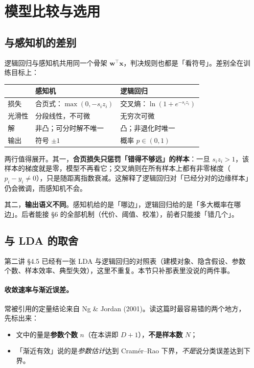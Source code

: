 \documentclass[11pt,a4paper,fontset=windows,zihao=-4]{ctexart}
\newcommand{\bw}{\mathbf{w}}
\newcommand{\bx}{\mathbf{x}}
\newcommand{\tp}{^{\top}}
\newcommand{\tabhead}{\sffamily\bfseries\color{navy}}
\begin{document}
\section{模型比较与选用}

\subsection{与感知机的差别}

逻辑回归与感知机共用同一个骨架 $\bw\tp\bx$，判决规则也都是「看符号」。差别全在训练目标上：

\begin{center}
\small
\begin{tabular}{@{}lp{5.4cm}p{5.4cm}@{}}
\toprule
\rowcolor{navy!7}
\tabhead & \tabhead 感知机 & \tabhead 逻辑回归\\
\midrule
损失 & 合页式：$\max(0,-s_i z_i)$ & 交叉熵：$\ln(1+e^{-s_iz_i})$\\
光滑性 & 分段线性，不可微 & 无穷次可微\\
解 & 非凸；可分时解不唯一 & 凸；非退化时唯一\\
输出 & 符号 $\pm1$ & 概率 $p\in(0,1)$\\
\bottomrule
\end{tabular}
\end{center}

两行值得展开。其一，\textbf{合页损失只惩罚「错得不够远」的样本}：一旦 $s_iz_i>1$，该样本的梯度就是零，模型不再看它；交叉熵则在所有样本上都有非零梯度（$p_i-y_i\ne0$），只是随距离指数衰减。这解释了逻辑回归对「已经分对的边缘样本」仍会微调，而感知机不会。

其二，\textbf{输出语义不同}。感知机给的是「哪边」，逻辑回归给的是「多大概率在哪边」。后者能接 \S6 的全部机制（代价、阈值、校准），前者只能接「错几个」。

\subsection{与 LDA 的取舍}

第二讲 \S4.5 已经有一张 LDA 与逻辑回归的对照表（建模对象、隐含假设、参数个数、样本效率、典型失效），这里不重复。本节只补那表里没说的两件事。

\paragraph{收敛速率与渐近误差。}常被引用的定量结论来自 Ng \& Jordan (2001)。读这篇时最容易错的两个地方，先标出来：

\begin{itemize}
  \item 文中的量是\textbf{参数个数} $n$（在本讲即 $D+1$），\textbf{不是样本数} $N$；
  \item 「渐近有效」说的是\emph{参数估计}达到 Cramér--Rao 下界，\emph{不是}说分类误差达到下界。
\end{itemize}
\end{document}
